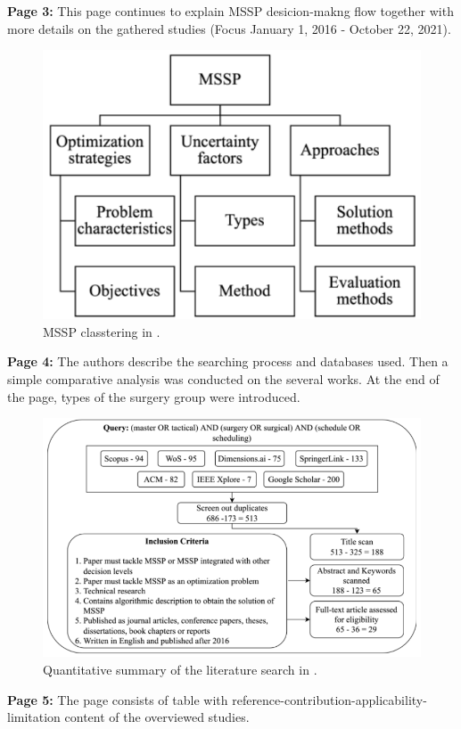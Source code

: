     \textbf{Page 3:}
    This page continues to explain MSSP desicion-makng flow together with more details on the gathered studies (Focus January 1, 2016 - October 22, 2021).
    \begin{figure}[H]
        \centering
        \includegraphics[width=.8\textwidth]{figures/0007_SR01MY19/fig1.png}
        \caption{MSSP classtering in \cite{x236}.}
        \label{fig1:0007_SR01MY19}
    \end{figure}

    \textbf{Page 4:}
    The authors describe the searching process and databases used. Then a simple comparative analysis was conducted on the several works. At the end of the page, types of the surgery group were introduced. 
    \begin{figure}[H]
        \centering
        \includegraphics[width=.8\textwidth]{figures/0007_SR01MY19/fig2.png}
        \caption{Quantitative summary of the literature search in \cite{x236}.}
        \label{fig2:0007_SR01MY19}
    \end{figure}

    \textbf{Page 5:}
    The page consists of table with reference-contribution-applicability-limitation content of the overviewed studies.

